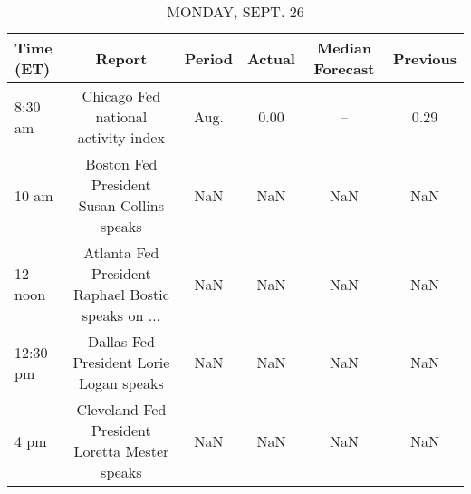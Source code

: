 \documentclass{article}%
\begin{document}
%
\normalsize%


\begin{table}[htbp]%
\caption{MONDAY, SEPT. 26}%
\centering%
\begin{adjustbox}{width=1\textwidth}%
\begin{tabular}{lccccc}
\toprule
Time (ET) &                                             Report & Period & Actual & Median Forecast & Previous \\
\midrule
  8:30 am &                Chicago Fed national activity index &   Aug. &   0.00 &              -- &     0.29 \\
    10 am &          Boston Fed President Susan Collins speaks &    NaN &    NaN &             NaN &      NaN \\
  12 noon & Atlanta Fed President Raphael Bostic speaks on ... &    NaN &    NaN &             NaN &      NaN \\
 12:30 pm &            Dallas Fed President Lorie Logan speaks &    NaN &    NaN &             NaN &      NaN \\
     4 pm &      Cleveland Fed President Loretta Mester speaks &    NaN &    NaN &             NaN &      NaN \\
\bottomrule
\end{tabular}
%
\end{adjustbox}%
\end{table}

%
\end{document}
